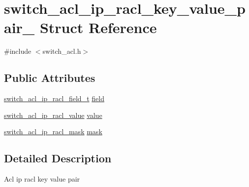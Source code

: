 \hypertarget{structswitch__acl__ip__racl__key__value__pair__}{\section{switch\+\_\+acl\+\_\+ip\+\_\+racl\+\_\+key\+\_\+value\+\_\+pair\+\_\+ Struct Reference}
\label{structswitch__acl__ip__racl__key__value__pair__}
}


{\ttfamily \#include $<$switch\+\_\+acl.\+h$>$}

\subsection*{Public Attributes}
\begin{DoxyCompactItemize}
\item 
\hyperlink{group__ACL_gab3c32093eb5fc25f4a3d5b17a13dcfcf}{switch\+\_\+acl\+\_\+ip\+\_\+racl\+\_\+field\+\_\+t} \hyperlink{structswitch__acl__ip__racl__key__value__pair___a24d821a9e5e0f574edbd705850525c23}{field}
\item 
\hyperlink{group__ACL_gaa75a5830dc886595aa7a32418cc610ff}{switch\+\_\+acl\+\_\+ip\+\_\+racl\+\_\+value} \hyperlink{structswitch__acl__ip__racl__key__value__pair___a19c5c367fd1880297829af499a9a2505}{value}
\item 
\hyperlink{group__ACL_ga575e03af8cd2193f5713be9ce8931c01}{switch\+\_\+acl\+\_\+ip\+\_\+racl\+\_\+mask} \hyperlink{structswitch__acl__ip__racl__key__value__pair___ae13b0cca10f22b15224df0b9840adc92}{mask}
\end{DoxyCompactItemize}


\subsection{Detailed Description}
Acl ip racl key value pair 

